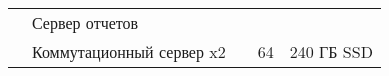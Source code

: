 \begin{table}[!htp]
\begin{small}
\begin{tabular}{|p{}                |p{}         |p{}                                                           |p{}              |p{}|}
                                      & Сервер отчетов          &                                                                        &                              & \\
        \cline{2-2}\cline{4-5}
                                      & Коммутационный сервер x2&                                                                        & 64                           & 240 ГБ SSD \\
        \hline
        \end{tabular}
    \end{small}
    \label{tab:system:req}
\end{table}

%
%
%
%
%
%
%

